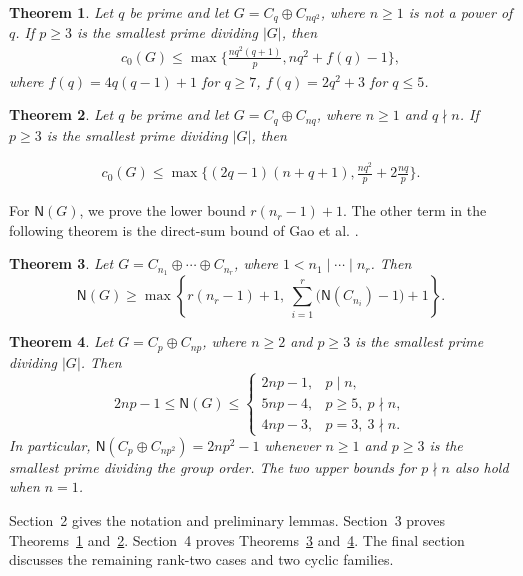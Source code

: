 \documentclass[10pt,reqno]{amsart}
\newtheorem{thm}{Theorem} [section]
\theoremstyle{definition}
\theoremstyle{remark}
\numberwithin{equation}{section}
\begin{document}
\begin{thm}\label{thm5.1}
	Let $q$ be prime and let $G=C_q\oplus C_{nq^2}$, where $n\ge1$ is not a power of $q$. If $p\ge3$ is the smallest prime dividing $|G|$, then
	\begin{align*}
		c_0(G)\le \max \{\frac{nq^2(q+1)}{p},nq^2 +f(q) -1\},
	\end{align*}
	where $f(q)= 4q(q-1) +1$ for $q\ge 7$, $f(q)= 2q^2 +3$ for $q\le 5$.
\end{thm}

\begin{thm}\label{thm1.2}
	Let $q$ be prime and let $G=C_q\oplus C_{nq}$, where $n\ge1$ and $q\nmid n$. If $p\ge3$ is the smallest prime dividing $|G|$, then
	
	\begin{align*}
		c_0(G)\le \max \{(2q-1)(n+q+1),\frac{nq^2}{p} +2\frac{nq}{p}\}. 
	\end{align*}
	
\end{thm}

For $\mathsf N(G)$, we prove the lower bound $r(n_r-1)+1$.
The other term in the following theorem is the direct-sum bound of
Gao et al. \cite[Theorem~1.1(2)]{[GHHLYZ2022-2]}.

\begin{thm}\label{thm1.4}
Let $G=C_{n_1}\oplus\cdots\oplus C_{n_r}$, where
$1<n_1\mid\cdots\mid n_r$. Then
\[
\mathsf{N}(G)\ge
\max\left\{r(n_r-1)+1,\ \sum_{i=1}^r\bigl(\mathsf{N}(C_{n_i})-1\bigr)+1\right\}.
\]
\end{thm}

\begin{thm}\label{thm1.5}
Let $G=C_p\oplus C_{np}$, where $n\ge2$ and $p\ge3$ is the
smallest prime dividing $|G|$. Then
\[
 2np-1\le\mathsf N(G)\le
 \begin{cases}
 2np-1,&p\mid n,\\
 5np-4,&p\ge5,\ p\nmid n,\\
 4np-3,&p=3,\ 3\nmid n.
 \end{cases}
\]
In particular, $\mathsf N(C_p\oplus C_{np^2})=2np^2-1$
whenever $n\ge1$ and $p\ge3$ is the smallest prime dividing the group order.
The two upper bounds for $p\nmid n$ also hold when $n=1$.
\end{thm}

Section~2 gives the notation and preliminary lemmas.
Section~3 proves Theorems~\ref{thm5.1} and~\ref{thm1.2}.
Section~4 proves Theorems~\ref{thm1.4} and~\ref{thm1.5}.
The final section discusses the remaining rank-two cases and two cyclic families.
\end{document}
